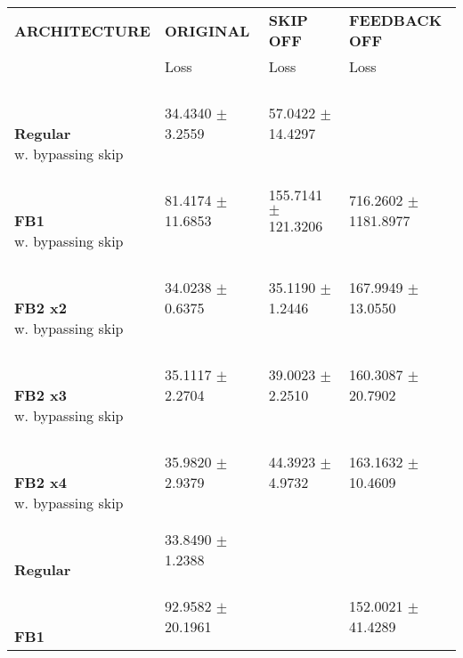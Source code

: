 
\begin{table}[h]
    \centering
    \begin{tabular}{|>{\columncolor{gray!05}}l|l|l|l|}
        \hline
        \rowcolor{gray!20}
        \textbf{\footnotesize ARCHITECTURE} & \textbf{\footnotesize ORIGINAL} & \textbf{\footnotesize SKIP OFF} & \textbf{\footnotesize FEEDBACK OFF} \\

        \rowcolor{gray!20}
        & {\footnotesize Loss} & {\footnotesize Loss} & {\footnotesize Loss} \\
        \hline
\shortstack[l]{\\ {} \\ \textbf{Regular}\\{w. bypassing skip}} & 34.4340 $\pm$ 3.2559 & 57.0422 $\pm$ 14.4297 &  \\
 \hline 
\shortstack[l]{\\ {} \\ \textbf{FB1}\\{w. bypassing skip}} & 81.4174 $\pm$ 11.6853 & 155.7141 $\pm$ 121.3206 & 716.2602 $\pm$ 1181.8977 \\
 \hline 
\shortstack[l]{\\ {} \\ \textbf{FB2 x2}\\{w. bypassing skip}} & 34.0238 $\pm$ 0.6375 & 35.1190 $\pm$ 1.2446 & 167.9949 $\pm$ 13.0550 \\
 \hline 
\shortstack[l]{\\ {} \\ \textbf{FB2 x3}\\{w. bypassing skip}} & 35.1117 $\pm$ 2.2704 & 39.0023 $\pm$ 2.2510 & 160.3087 $\pm$ 20.7902 \\
 \hline 
\shortstack[l]{\\ {} \\ \textbf{FB2 x4}\\{w. bypassing skip}} & 35.9820 $\pm$ 2.9379 & 44.3923 $\pm$ 4.9732 & 163.1632 $\pm$ 10.4609 \\
 \hline 
\shortstack[l]{\\ {} \\ \textbf{Regular}\\{}} & 33.8490 $\pm$ 1.2388 &  &  \\
 \hline 
\shortstack[l]{\\ {} \\ \textbf{FB1}\\{}} & 92.9582 $\pm$ 20.1961 &  & 152.0021 $\pm$ 41.4289 \\

\end{tabular}
\end{table}
